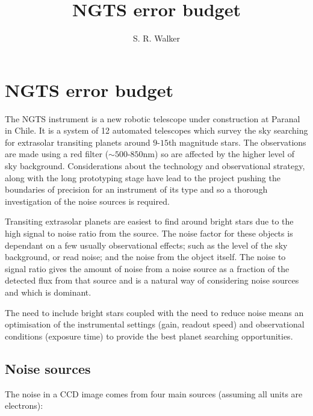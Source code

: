 \documentclass[a4paper]{report}
\title{NGTS error budget}
\author{S. R. Walker}
\begin{document}

\chapter{NGTS error budget}

The NGTS instrument is a new robotic telescope under construction at
Paranal in Chile. It is a system of 12 automated telescopes which survey
the sky searching for extrasolar transiting planets around $9$-$15$th
magnitude stars. The observations are made using a red filter ($\sim
500$-$850$nm) so are affected by the higher level of sky background.
Considerations about the technology and observational strategy, along
with the long prototyping stage have lead to the project pushing the
boundaries of precision for an instrument of its type and so a thorough
investigation of the noise sources is required.

Transiting extrasolar planets are easiest to find around bright 
stars due to the high signal to noise ratio from the source. The noise
factor for these objects is dependant on a few usually observational
effects; such as the level of the sky background, or read noise; and the
noise from the object itself. The noise to signal ratio gives the amount
of noise from a noise source as a fraction of the detected flux from
that source and is a natural way of considering noise sources and which
is dominant. 

The need to include bright stars coupled with the need to reduce noise
means an optimisation of the instrumental settings (gain, readout speed)
and observational conditions (exposure time) to provide the best planet
searching opportunities.

\section{Noise sources}

The noise in a CCD image comes from four main sources (assuming all
units are electrons):
\end{document}
